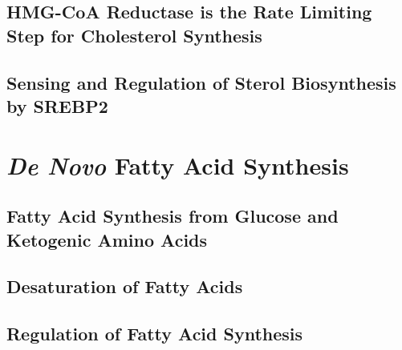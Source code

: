\documentclass{tufte-handout}
\begin{document}
\subsection{HMG-CoA Reductase is the Rate Limiting Step for Cholesterol Synthesis}

\subsection{Sensing and Regulation of Sterol Biosynthesis by SREBP2}

\section{\textit{De Novo} Fatty Acid Synthesis}

\subsection{Fatty Acid Synthesis from Glucose and Ketogenic Amino Acids}

\subsection{Desaturation of Fatty Acids}

\subsection{Regulation of Fatty Acid Synthesis}



\end{document}
